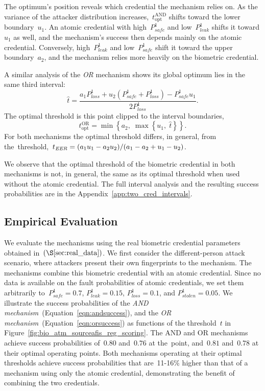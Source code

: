 \documentclass[conference,compsoc]{IEEEtran}
\begin{document}
The optimum's position reveals which credential the mechanism relies on.
As the variance of the attacker distribution increases,~$t_{\text{opt}}^{\mathrm{AND}}$ shifts toward the lower boundary~$u_1$.
An atomic credential with high~$P^1_{safe}$ and low~$P^1_{leak}$ shifts it toward $u_1$ as well, and the mechanism's success then depends mainly on the atomic credential.
Conversely, high~$P^1_{leak}$ and low~$P^1_{safe}$ shift it toward the upper boundary~$a_2$, and the mechanism relies more heavily on the biometric credential.

A similar analysis of the \emph{OR} mechanism shows its global optimum lies in the same third interval:
\begin{equation*}
\hat{t}
=
\frac{a_1 P^1_{loss} + u_2 (P^1_{safe} + P^1_{loss}) - P^1_{safe} u_1}{2 P^1_{loss}}.
\end{equation*}
The optimal threshold is this point clipped to the interval boundaries,
\begin{equation*}
t_{\text{opt}}^{\mathrm{OR}} = \min\left\{a_2,\;\max\left\{u_1,\;\hat{t}\right\}\right\}.
\end{equation*}
For both mechanisms the optimal threshold differs, in general, from the~\EER threshold,~$t_{\textit{EER}} = (a_1 u_1 - a_2 u_2)/(a_1 - a_2 + u_1 - u_2)$.

We observe that the optimal threshold of the biometric credential in both mechanisms is not, in general, the same as its optimal threshold when used without the atomic credential.
The full interval analysis and the resulting success probabilities are in the Appendix~\ref{app:two_cred_intervals}.

\subsection{Empirical Evaluation}\label{sec:two_credentials_empirical_eval}
\noindent
We evaluate the mechanisms using the real biometric credential parameters obtained in~$(\S\ref{sec:real_data})$.
We first consider the different-person attack scenario, where attackers present their own fingerprints to the mechanism. The mechanisms combine this biometric credential with an atomic credential. Since no data is available on the fault probabilities of atomic credentials, we set them arbitrarily to~$P^1_{safe} = 0.7$, $P^1_{leak} = 0.15$, $P^1_{loss} = 0.1$, and $P^1_{stolen} = 0.05$. We illustrate  the success probabilities of the \emph{AND mechanism}~(Equation~\ref{eqn:andsuccess}), and the \emph{OR mechanism}~(Equation~\ref{eqn:orsuccess}) as functions of the threshold~$t$ in Figure~\ref{fig:bio_atm_sourceafis_reg_scoring}. The AND and OR mechanisms achieve success probabilities of~$0.80$ and~$0.76$ at the~\EER point, and~$0.81$ and~$0.78$ at their optimal operating points. Both mechanisms operating at their optimal thresholds achieve success probabilities that are~11-16\% higher than that of a mechanism using only the atomic credential, demonstrating the benefit of combining the two credentials.
\end{document}
